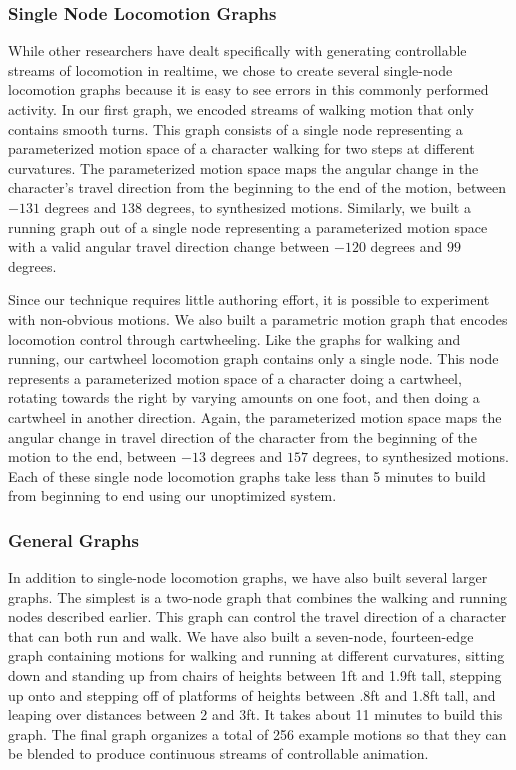 \documentclass[10pt,twocolumn]{article}
\begin{document}
\subsubsection{Single Node Locomotion Graphs}

While other researchers have dealt specifically with generating controllable streams of locomotion in realtime, we chose to create several single-node locomotion graphs because it is easy to see errors in this commonly performed activity. In our first graph, we encoded streams of walking motion that only contains smooth turns. This graph consists of a single node representing a parameterized motion space of a character walking for two steps at different curvatures. The parameterized motion space maps the angular change in the character's travel direction from the beginning to the end of the motion, between $-131$ degrees and $138$ degrees, to synthesized motions. Similarly, we built a running graph out of a single node representing a parameterized motion space with a valid angular travel direction change between $-120$ degrees and $99$ degrees.

Since our technique requires little authoring effort, it is possible to experiment with non-obvious motions. We also built a parametric motion graph that encodes locomotion control through cartwheeling. Like the graphs for walking and running, our cartwheel locomotion graph contains only a single node. This node represents a parameterized motion space of a character doing a cartwheel, rotating towards the right by varying amounts on one foot, and then doing a cartwheel in another direction. Again, the parameterized motion space maps the angular change in travel direction of the character from the beginning of the motion to the end, between $-13$ degrees and $157$ degrees, to synthesized motions. Each of these single node locomotion graphs take less than 5 minutes to build from beginning to end using our unoptimized system.

\subsubsection{General Graphs}

In addition to single-node locomotion graphs, we have also built several larger graphs. The simplest is a two-node graph that combines the walking and running nodes described earlier. This graph can control the travel direction of a character that can both run and walk. We have also built a seven-node, fourteen-edge graph containing motions for walking and running at different curvatures, sitting down and standing up from chairs of heights between 1ft and 1.9ft tall, stepping up onto and stepping off of platforms of heights between .8ft and 1.8ft tall, and leaping over distances between 2 and 3ft. It takes about 11 minutes to build this graph. The final graph organizes a total of 256 example motions so that they can be blended to produce continuous streams of controllable animation.
\end{document}
